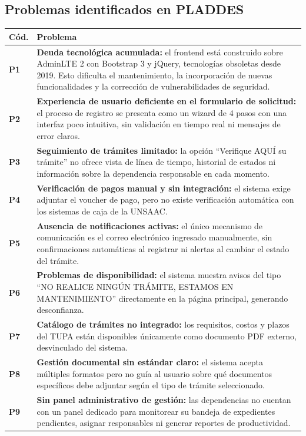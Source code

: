 \subsection{Problemas identificados en PLADDES}
 
\begin{longtable}{>{\bfseries}p{1.2cm} p{12cm}}
\toprule
\textbf{Cód.} & \textbf{Problema} \\
\midrule
\endhead
P1 & \textbf{Deuda tecnológica acumulada:} el frontend está construido sobre AdminLTE 2 con Bootstrap 3 y jQuery, tecnologías obsoletas desde 2019. Esto dificulta el mantenimiento, la incorporación de nuevas funcionalidades y la corrección de vulnerabilidades de seguridad. \\[0.3cm]
P2 & \textbf{Experiencia de usuario deficiente en el formulario de solicitud:} el proceso de registro se presenta como un wizard de 4 pasos con una interfaz poco intuitiva, sin validación en tiempo real ni mensajes de error claros. \\[0.3cm]
P3 & \textbf{Seguimiento de trámites limitado:} la opción ``Verifique AQUÍ su trámite'' no ofrece vista de línea de tiempo, historial de estados ni información sobre la dependencia responsable en cada momento. \\[0.3cm]
P4 & \textbf{Verificación de pagos manual y sin integración:} el sistema exige adjuntar el voucher de pago, pero no existe verificación automática con los sistemas de caja de la UNSAAC. \\[0.3cm]
P5 & \textbf{Ausencia de notificaciones activas:} el único mecanismo de comunicación es el correo electrónico ingresado manualmente, sin confirmaciones automáticas al registrar ni alertas al cambiar el estado del trámite. \\[0.3cm]
P6 & \textbf{Problemas de disponibilidad:} el sistema muestra avisos del tipo ``NO REALICE NINGÚN TRÁMITE, ESTAMOS EN MANTENIMIENTO'' directamente en la página principal, generando desconfianza. \\[0.3cm]
P7 & \textbf{Catálogo de trámites no integrado:} los requisitos, costos y plazos del TUPA están disponibles únicamente como documento PDF externo, desvinculado del sistema. \\[0.3cm]
P8 & \textbf{Gestión documental sin estándar claro:} el sistema acepta múltiples formatos pero no guía al usuario sobre qué documentos específicos debe adjuntar según el tipo de trámite seleccionado. \\[0.3cm]
P9 & \textbf{Sin panel administrativo de gestión:} las dependencias no cuentan con un panel dedicado para monitorear su bandeja de expedientes pendientes, asignar responsables ni generar reportes de productividad. \\
\bottomrule
\end{longtable}
 
